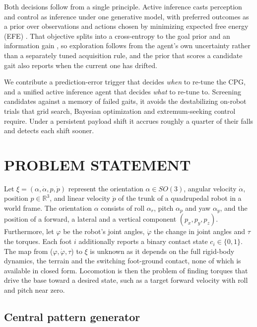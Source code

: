 \documentclass[letterpaper, 10 pt, conference]{ieeeconf}  %
\begin{document}
Both decisions follow from a single principle.
Active inference casts perception and control as inference under one generative model, with preferred outcomes as a prior over observations and actions chosen by minimizing expected free energy (EFE) \cite{friston2015active, dacosta2020active}.
That objective splits into a cross-entropy to the goal prior and an information gain \cite{koudahl2021on, kouw2023information}, so exploration follows from the agent's own uncertainty rather than a separately tuned acquisition rule, and the prior that scores a candidate gait also reports when the current one has drifted.

We contribute a prediction-error trigger that decides \emph{when} to re-tune the CPG, and a unified active inference agent that decides \emph{what} to re-tune to.
Screening candidates against a memory of failed gaits, it avoids the destabilizing on-robot trials that grid search, Bayesian optimization and extremum-seeking control require.
Under a persistent payload shift it accrues roughly a quarter of their falls and detects each shift sooner.

\section{PROBLEM STATEMENT}
\label{sec:problem}

Let $\xi = (\alpha, \dot{\alpha}, p, \dot{p})$ represent the orientation $\alpha \in SO(3)$, angular velocity $\dot{\alpha}$, position $p \in \mathbb{R}^3$, and linear velocity $\dot{p}$ of the trunk of a quadrupedal robot in a world frame.
The orientation $\alpha$ consists of roll $\alpha_r$, pitch $\alpha_p$ and yaw $\alpha_y$, and the position of a forward, a lateral and a vertical component $(p_x, p_y, p_z)$. 
Furthermore, let $\varphi$ be the robot's joint angles, $\dot{\varphi}$ the change in joint angles and $\tau$ the torques. Each foot $i$ additionally reports a binary contact state $c_i \in \{0,1\}$.
The map from ($\varphi, \dot{\varphi}, \tau$) to $\xi$ is unknown as it depends on the full rigid-body dynamics, the terrain and the switching foot-ground contact, none of which is available in closed form.
%
Locomotion is then the problem of finding torques that drive the base toward a desired state, such as a target forward velocity with roll and pitch near zero. 

\subsection{Central pattern generator}
\label{sec:cpg}
\end{document}

